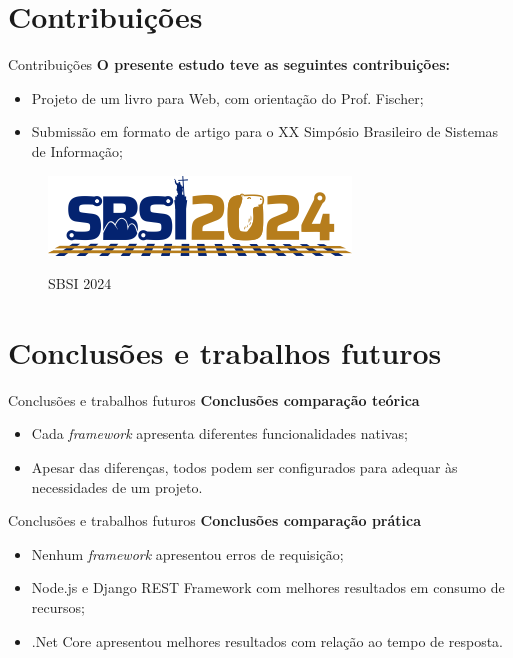 \documentclass{libs/ufc_format}
\begin{document}
\section{Contribuições}
\begin{frame}{Contribuições}
    \textbf{O presente estudo teve as seguintes contribuições:}
    \begin{itemize}
        \item Projeto de um livro para Web, com orientação do Prof. Fischer;
        \item Submissão em formato de artigo para o XX Simpósio Brasileiro de Sistemas de Informação;
    \end{itemize}
    \begin{figure}[H]
        \centering
        \caption{SBSI 2024}
        \includegraphics[width=0.6\linewidth]{figuras/sbsi2024.png}
        \captionsetup{justification=centering}
        \label{fig:model-endurance}
    \end{figure}
\end{frame}
 

\section{Conclusões e trabalhos futuros}

\begin{frame}{Conclusões e trabalhos futuros}
    \textbf{Conclusões comparação teórica}
    \begin{itemize}
        \item Cada \textit{framework} apresenta diferentes funcionalidades nativas;
        \vspace*{0.5em}
        \item Apesar das diferenças, todos podem ser configurados para adequar às necessidades de um projeto.
    \end{itemize}
\end{frame}

\begin{frame}{Conclusões e trabalhos futuros}
    \textbf{Conclusões comparação prática}
    \begin{itemize}
        \item Nenhum \textit{framework} apresentou erros de requisição;
        \vspace*{0.5em}
        \item Node.js e Django REST Framework com melhores resultados em consumo de recursos;
        \vspace*{0.5em}
        \item .Net Core apresentou melhores resultados com relação ao tempo de resposta.
    \end{itemize}
\end{frame}
\end{document}
